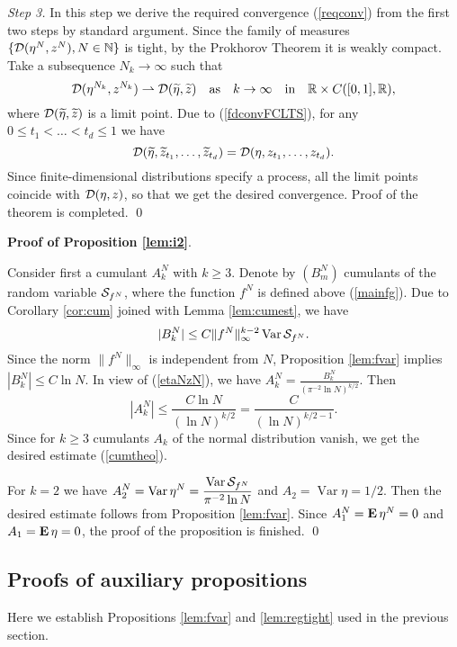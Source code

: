 \documentclass{article}
\numberwithin{equation}{section}
\newcommand{\mR}{\mathbb{R}}
\newcommand{\mN}{\mathbb{N}}
\newcommand{\DD}{{\cal D}}
\newcommand{\SSS}{{\cal S}}
\newcommand{\Var}{\operatorname{Var}}
\newcommand{\wid}{\widetilde}
\newcommand{\ssk}{\smallskip}
\newcommand{\MO}{\mbox{\bf E}\,}
\newcommand{\ds}{\displaystyle{}}
\newcommand{\ra}{\rightarrow}
\newcommand{\raw}{\rightharpoonup}
\newcommand{\fr}{\frac}
\newcommand{\qmb}{\quad\mbox}
\newcommand{\qu}{\quad}
\newcommand{\ass}{\quad\mbox{as}\quad}
\newcommand{\rprop}{Proposition \nolinebreak}
\newcommand{\rlem}{Lemma \nolinebreak}
\begin{document}
{\it Step 3.} In this step
we derive the required convergence (\ref{reqconv})
from the first two steps
by standard argument.
Since the family of measures
$\{\DD(\eta^{N},z^{N}), N\in\mN\}$
is tight,
by the Prokhorov Theorem
it is weakly compact.
Take a subsequence $N_k\ra\infty$
such that
$$
\DD(\eta^{N_k},z^{N_k})\raw \DD(\wid\eta,\wid z)
\ass k\ra \infty
\qmb{in}\qu
\mR\times C([0,1],\mR),
$$
where $\DD(\wid\eta,\wid z)$
is a limit point.
Due to (\ref{fdconvFCLTS}),
for any $0\leq t_1<\ldots<t_d\leq 1$ we have
$$
\DD(\wid\eta,\wid z_{t_1},\ldots, \wid z_{t_d})
=\DD(\eta,z_{t_1},\ldots, z_{t_d}).
$$
Since finite-dimensional distributions
specify a process,
all the limit points coincide
with $\DD(\eta,z)$,
so that we get the desired convergence.
Proof of the theorem is completed.
\qed

\ssk
{\bf Proof of \rprop\ref{lem:i2}}.

Consider first a cumulant $A_k^N$ with $k\geq 3$.
Denote by $(B_m^N)$ cumulants of the random variable $\SSS_{f^N}$,
where the function $f^N$ is defined above (\ref{mainfg}).
Due to Corollary \nolinebreak \ref{cor:cum}
joined with \rlem \ref{lem:cumest},
we have
$$|B^N_k|\leq C\|f^N\|^{k-2}_\infty \Var\SSS_{f^N}.$$
Since the norm $\|f^N\|_\infty$ is independent from $N$,
\rprop \ref{lem:fvar} implies
$|B_k^N|\leq C\ln N$.
In view of  (\ref{etaNzN}), we have
$\ds{ A^N_k=\fr{B^N_k}{(\pi^{-2}\ln N)^{k/2}} }.$
Then
$$
|A^N_k|\leq \fr{C\ln N}{(\ln N)^{k/2}}=\fr{C}{(\ln N)^{k/2-1}}.
$$
Since for $k\geq 3$ cumulants $A_k$ of the normal distribution vanish,
we get the desired estimate (\ref{cumtheo}).

For $k=2$ we have
$\ds{A^N_2=\Var\eta^N=\fr{\Var\SSS_{f^N}}{\pi^{-2}\ln N}}$ and $A_2=\Var\eta=1/2$.
Then the desired estimate follows from \rprop \ref{lem:fvar}.
Since $A^N_1=\MO\eta^N=0$ and $A_1=\MO\eta=0$, the proof of the proposition  is finished.
\qed

\subsection{Proofs of auxiliary propositions}

Here we establish Propositions \ref{lem:fvar} and \ref{lem:regtight}
used in the previous section.
\end{document}
